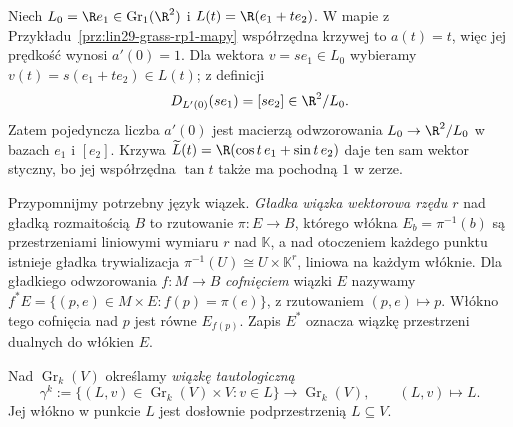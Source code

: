 \begin{przyklad}
Niech $L_0=\R e_1\in\operatorname{Gr}_1(\R^2)$ i
$L(t)=\R(e_1+t e_2)$. W mapie z
Przykładu~\ref{prz:lin29-grass-rp1-mapy}
współrzędna krzywej to $a(t)=t$, więc jej prędkość
wynosi $a'(0)=1$. Dla wektora $v=s e_1\in L_0$
wybieramy $v(t)=s(e_1+t e_2)\in L(t)$; z definicji
\[
 D_{L'(0)}(s e_1)=[s e_2]\in\R^2/L_0.
\]
Zatem pojedyncza liczba $a'(0)$ jest macierzą
odwzorowania $L_0\to\R^2/L_0$ w bazach
$e_1$ i $[e_2]$. Krzywa
$\widetilde L(t)=\R(\cos t\,e_1+\sin t\,e_2)$
daje ten sam wektor styczny, bo jej współrzędna
$\tan t$ także ma pochodną $1$ w zerze.
\end{przyklad}

Przypomnijmy potrzebny język wiązek. \emph{Gładka wiązka
wektorowa rzędu \(r\)} nad gładką rozmaitością \(B\)
to rzutowanie \(\pi:E\to B\), którego włókna
\(E_b=\pi^{-1}(b)\) są przestrzeniami liniowymi
wymiaru \(r\) nad \(\mathbb K\), a nad otoczeniem
każdego punktu istnieje gładka trywializacja
\(\pi^{-1}(U)\cong U\times\mathbb K^r\), liniowa
na każdym włóknie. Dla gładkiego odwzorowania
\(f:M\to B\) \emph{cofnięciem} wiązki \(E\)
nazywamy \(f^*E=\{(p,e)\in M\times E:
f(p)=\pi(e)\}\), z rzutowaniem \((p,e)\mapsto p\).
Włókno tego cofnięcia nad \(p\) jest
równe \(E_{f(p)}\). Zapis \(E^*\) oznacza
wiązkę przestrzeni dualnych do włókien \(E\).

\begin{definicja}
\label{def:lin29-grass-taut}
Nad $\operatorname{Gr}_k(V)$ określamy
\emph{wiązkę tautologiczną}
\[
 \gamma^k
 :=\{(L,v)\in\operatorname{Gr}_k(V)\times V:v\in L\}
 \longrightarrow\operatorname{Gr}_k(V),\qquad (L,v)\mapsto L.
\]
Jej włókno w punkcie $L$ jest dosłownie podprzestrzenią
$L\subseteq V$.
\end{definicja}

